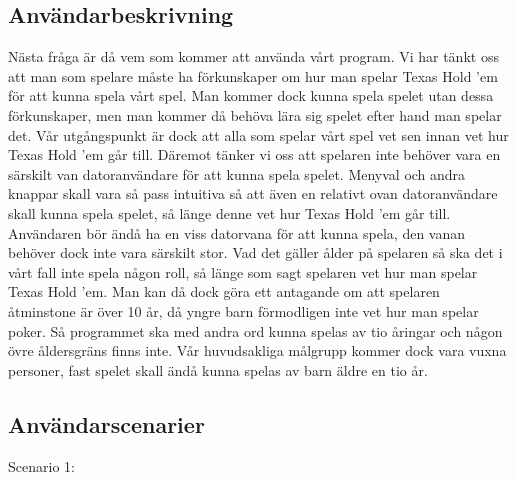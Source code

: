 \documentclass[10pt,twoside,a4paper]{article}
\begin{document}
\subsection*{Användarbeskrivning}

Nästa fråga är då vem som kommer att använda vårt program. Vi har tänkt oss
att man som spelare måste ha förkunskaper om hur man spelar Texas Hold ’em
för att kunna spela vårt spel. Man kommer dock kunna spela spelet utan
dessa förkunskaper, men man kommer då behöva lära sig spelet efter hand man
spelar det. Vår utgångspunkt är dock att alla som spelar vårt spel vet sen
innan vet hur Texas Hold ’em går till. Däremot tänker vi oss att spelaren
inte behöver vara en särskilt van datoranvändare för att kunna spela
spelet. Menyval och andra knappar skall vara så pass intuitiva så att även
en relativt ovan datoranvändare skall kunna spela spelet, så länge denne
vet hur Texas Hold ’em går till. Användaren bör ändå ha en viss datorvana
för att kunna spela, den vanan behöver dock inte vara särskilt stor. Vad
det gäller ålder på spelaren så ska det i vårt fall inte spela någon roll,
så länge som sagt spelaren vet hur man spelar Texas Hold ’em. Man kan då
dock göra ett antagande om att spelaren åtminstone är över 10 år, då yngre
barn förmodligen inte vet hur man spelar poker. Så programmet ska med andra
ord kunna spelas av tio åringar och någon övre åldersgräns finns inte. Vår
huvudsakliga målgrupp kommer dock vara vuxna personer, fast spelet skall
ändå kunna spelas av barn äldre en tio år.

\subsection*{Användarscenarier}

Scenario 1:
\end{document}
